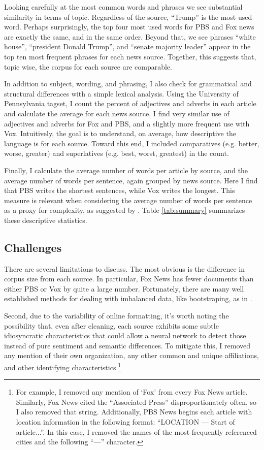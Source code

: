 \documentclass{article}
\begin{document}
	    Looking carefully at the most common words and phrases we see substantial similarity in terms of topic. Regardless of the source, ``Trump'' is the most used word. Perhaps surprisingly, the top four most used words for PBS and Fox news are exactly the same, and in the same order. Beyond that, we see phrases ``white house'', ``president Donald Trump'', and ``senate majority leader'' appear in the top ten most frequent phrases for each news source. Together, this suggests that, topic wise, the corpus for each source are comparable. 
	    
	    In addition to subject, wording, and phrasing, I also check for grammatical and structural differences with a simple lexical analysis. Using the University of Pennsylvania tagset, I count the percent of adjectives and adverbs in each article and calculate the average for each news source. I find very similar use of adjectives and adverbs for Fox and PBS, and a slightly more frequent use with Vox. Intuitively, the goal is to understand, on average, how descriptive the language is for each source. Toward this end, I included comparatives (e.g. better, worse, greater) and superlatives (e.g. best, worst, greatest) in the count.
	    
	    Finally, I calculate the average number of words per article by source, and the average number of words per sentence, again grouped by news source. Here I find that PBS writes the shortest sentences, while Vox writes the longest. This measure is relevant when considering the average number of words per sentence as a proxy for complexity, as suggested by \citet{flesch1948new}. Table \ref{tab:summary} summarizes these descriptive statistics.  
 
    	
	    
	\subsection{Challenges} \label{Challenges}
	    There are several limitations to discuss. The most obvious is the difference in corpus size from each source. In particular, Fox News has fewer documents than either PBS or Vox by quite a large number. Fortunately, there are many well established methods for dealing with imbalanced data, like bootstraping, as in \citet{dupret2001bootstrap}. 
	    
	    Second, due to the variability of online formatting, it's worth noting the possibility that, even after cleaning, each source exhibits some subtle idiosyncratic characteristics that could allow a neural network to detect those instead of pure sentiment and semantic differences. To mitigate this, I removed any mention of their own organization, any other common and unique affiliations, and other identifying characteristics.\footnote{For example, I removed any mention of `Fox' from every Fox News article. Similarly, Fox News cited the ``Associated Press'' disproportionately often, so I also removed that string. Additionally, PBS News begins each article with location information in the following format: ``LOCATION --- Start of article...''. In this case, I removed the names of the most frequently referenced cities and the following ``---'' character.} 
	    
\end{document}
